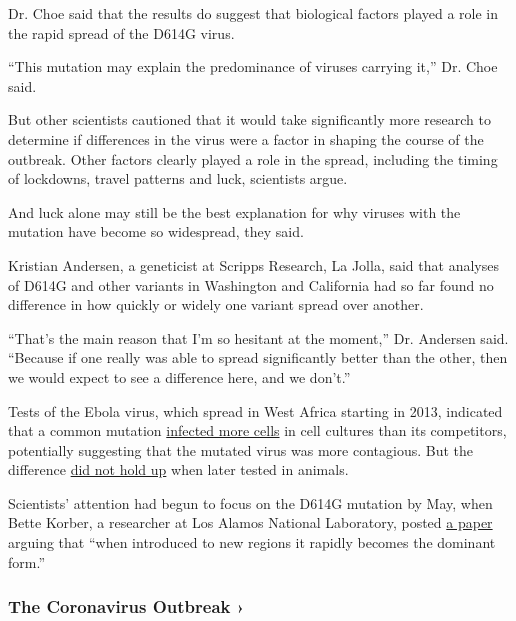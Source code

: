 Dr. Choe said that the results do suggest that biological factors played
a role in the rapid spread of the D614G virus.

``This mutation may explain the predominance of viruses carrying it,''
Dr. Choe said.

But other scientists cautioned that it would take significantly more
research to determine if differences in the virus were a factor in
shaping the course of the outbreak. Other factors clearly played a role
in the spread, including the timing of lockdowns, travel patterns and
luck, scientists argue.

And luck alone may still be the best explanation for why viruses with
the mutation have become so widespread, they said.

Kristian Andersen, a geneticist at Scripps Research, La Jolla, said that
analyses of D614G and other variants in Washington and California had so
far found no difference in how quickly or widely one variant spread over
another.

``That's the main reason that I'm so hesitant at the moment,'' Dr.
Andersen said. ``Because if one really was able to spread significantly
better than the other, then we would expect to see a difference here,
and we don't.''

Tests of the Ebola virus, which spread in West Africa starting in 2013,
indicated that a common mutation
\href{https://jvi.asm.org/content/91/2/e01913-16}{infected more cells}
in cell cultures than its competitors, potentially suggesting that the
mutated virus was more contagious. But the difference
\href{https://www.cell.com/cell-reports/fulltext/S2211-1247(18)30569-2?_returnURL=https\%3A\%2F\%2Flinkinghub.elsevier.com\%2Fretrieve\%2Fpii\%2FS2211124718305692\%3Fshowall\%3Dtrue}{did
not hold up} when later tested in animals.

Scientists' attention had begun to focus on the D614G mutation by May,
when Bette Korber, a researcher at Los Alamos National Laboratory,
posted
\href{https://www.biorxiv.org/content/10.1101/2020.04.29.069054v2}{a
paper} arguing that ``when introduced to new regions it rapidly becomes
the dominant form.''

\href{https://www.nytimes.com/news-event/coronavirus?action=click\&pgtype=Article\&state=default\&region=MAIN_CONTENT_3\&context=storylines_faq}{}

\hypertarget{the-coronavirus-outbreak-}{%
\subsubsection{The Coronavirus Outbreak
›}\label{the-coronavirus-outbreak-}}

